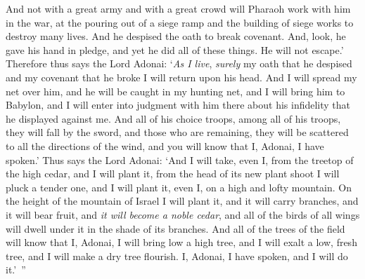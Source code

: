 \begin{biblechapter}
\verse And not with a great army and with a great crowd will Pharaoh work with him in the war, at the pouring out of a siege ramp and the building of siege works to destroy many lives.
\verse And he despised the oath to break covenant. And, look, he gave his hand in pledge, and yet he did all of these things. He will not escape.’
\verse Therefore thus says the Lord Adonai: ‘\textit{As I live}, \textit{surely} my oath that he despised and my covenant that he broke I will return upon his head.
\verse And I will spread my net over him, and he will be caught in my hunting net, and I will bring him to Babylon, and I will enter into judgment with him there about his infidelity that he displayed against me.
\verse And all of his choice troops, among all of his troops, they will fall by the sword, and those who are remaining, they will be scattered to all the directions of the wind, and you will know that I, Adonai, I have spoken.’
\verse Thus says the Lord Adonai: ‘And I will take, even I, from the treetop of the high cedar, and I will plant it, from the head of its new plant shoot I will pluck a tender one, and I will plant it, even I, on a high and lofty mountain.
\verse On the height of the mountain of Israel I will plant it, and it will carry branches, and it will bear fruit, and \textit{it will become a noble cedar}, and all of the birds of all wings will dwell under it in the shade of its branches.
\verse And all of the trees of the field will know that I, Adonai, I will bring low a high tree, and I will exalt a low, fresh tree, and I will make a dry tree flourish. I, Adonai, I have spoken, and I will do it.’ ”
\end{biblechapter}

